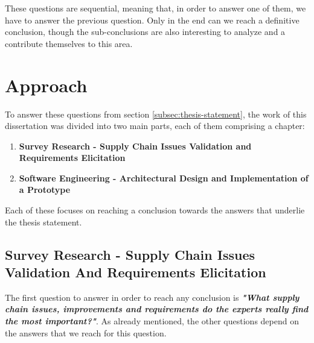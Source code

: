 These questions are sequential, meaning that, in order to answer one of them, we have to answer the previous question. Only in the end can we reach a definitive conclusion, though the sub-conclusions are also interesting to analyze and a contribute themselves to this area.


\section{Approach}


To answer these questions from section \ref{subsec:thesis-statement}, the work of this dissertation was divided into two main parts, each of them comprising a chapter:
\begin{enumerate}
\item \textbf{Survey Research - Supply Chain Issues Validation and Requirements Elicitation}
\item \textbf{Software Engineering - Architectural Design and Implementation of a Prototype}
\end{enumerate}


Each of these focuses on reaching a conclusion towards the answers that underlie the thesis statement.

\subsection{Survey Research - Supply Chain Issues Validation And Requirements Elicitation}
\label{sec:survey-approach}
The first question to answer in order to reach any conclusion is \textbf{\textit{"What supply chain issues, improvements and requirements do the experts really find the most important?"}}. As already mentioned, the other questions depend on the answers that we reach for this question.


